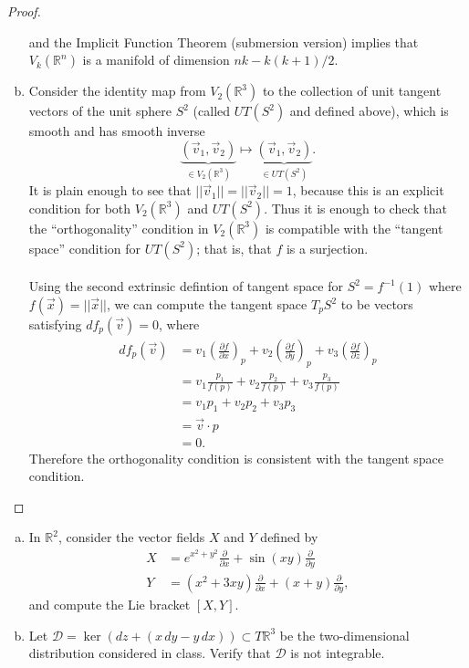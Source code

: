 \documentclass{article}
\newenvironment{problem}[2][Problem]{\begin{trivlist}
\item[\hskip \labelsep {\bfseries #1}\hskip \labelsep {\bfseries #2.}]}{\end{trivlist}}
\begin{document}
\begin{proof}
\begin{enumerate}[(a)]
      and the Implicit Function Theorem (submersion version) implies that
      $V_k(\mathbb{R}^n)$ is a manifold of dimension $nk - k(k+1)/2$.
    \item Consider the identity map from $V_2(\mathbb{R}^3)$ to the
      collection of unit tangent vectors of the unit sphere $S^2$
      (called $UT(S^2)$ and defined above), which is smooth and has smooth
      inverse \[
        \underbrace{(\vec{v}_1, \vec{v}_2)}_{\in V_2(\mathbb{R}^3)} \mapsto
        \underbrace{(\vec{v}_1, \vec{v}_2)}_{\in UT(S^2)}.
      \]
      It is plain enough to see that $||\vec{v}_1|| = ||\vec{v}_2|| = 1$,
      because this is an explicit condition for both $V_2(\mathbb{R}^3)$ and
      $UT(S^2)$. Thus it is enough to check that the ``orthogonality''
      condition in $V_2(\mathbb{R}^3)$ is compatible with the ``tangent space''
      condition for $UT(S^2)$; that is, that $f$ is a surjection.\\~\\
      Using the second extrinsic defintion of tangent space for
      $S^2 = f^{-1}(1)$ where $f(\vec{x}) = ||\vec{x}||$, we can compute
      the tangent space $T_pS^2$ to be vectors satisfying $df_p(\vec{v}) = 0$,
      where \begin{align*}
        df_p(\vec{v}) &= v_1\left(\frac{\partial f}{\partial x}\right)_p
         + v_2\left(\frac{\partial f}{\partial y}\right)_p
         + v_3\left(\frac{\partial f}{\partial z}\right)_p \\
        &= v_1\frac{p_1}{f(p)} + v_2\frac{p_2}{f(p)} + v_3\frac{p_3}{f(p)} \\
        &= v_1p_1 + v_2p_2 + v_3p_3 \\
        &= \vec{v} \cdot p \\
        &= 0.
      \end{align*}
      Therefore the orthogonality condition is consistent with the tangent space
      condition.
  \end{enumerate}
\end{proof}

\pagebreak

\begin{problem}{2} \text{\\}
  \begin{enumerate}[(a)]
    \item In $\mathbb{R}^2$, consider the vector fields $X$ and $Y$ defined by
    \begin{align*}
      X &= e^{x^2 + y^2} \frac{\partial}{\partial x} + \sin(xy) \frac{\partial}{\partial y}\\
      Y &= (x^2 + 3xy)\frac{\partial}{\partial x} + (x + y) \frac{\partial}{\partial y},
    \end{align*} and compute the Lie bracket $[X, Y]$.
    \item Let $\mathcal{D} = \ker(dz + (x\,dy - y\,dx)) \subset T\mathbb{R}^3$
      be the two-dimensional distribution considered in class. Verify that
      $\mathcal{D}$ is not integrable.
  \end{enumerate}
\end{problem}
\end{document}
